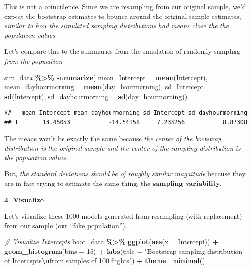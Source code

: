 \documentclass[
]{book}
\newenvironment{Shaded}{\begin{snugshade}}{\end{snugshade}}
\newcommand{\AttributeTok}[1]{\textcolor[rgb]{0.13,0.29,0.53}{#1}}
\newcommand{\CommentTok}[1]{\textcolor[rgb]{0.56,0.35,0.01}{\textit{#1}}}
\newcommand{\DecValTok}[1]{\textcolor[rgb]{0.00,0.00,0.81}{#1}}
\newcommand{\FunctionTok}[1]{\textcolor[rgb]{0.13,0.29,0.53}{\textbf{#1}}}
\newcommand{\NormalTok}[1]{#1}
\newcommand{\SpecialCharTok}[1]{\textcolor[rgb]{0.81,0.36,0.00}{\textbf{#1}}}
\newcommand{\StringTok}[1]{\textcolor[rgb]{0.31,0.60,0.02}{#1}}
\begin{document}
This is not a coincidence. Since we are resampling from our original sample, we'd expect the bootstrap estimates to bounce around the original sample estimates, \emph{similar to how the simulated sampling distributions had means close the the population values}

Let's compare this to the summaries from the simulation of randomly sampling \emph{from the population}.

\begin{Shaded}
\begin{Highlighting}[]
\NormalTok{sim\_data }\SpecialCharTok{\%\textgreater{}\%} 
    \FunctionTok{summarize}\NormalTok{(}
        \AttributeTok{mean\_Intercept =} \FunctionTok{mean}\NormalTok{(Intercept),}
        \AttributeTok{mean\_dayhourmorning =} \FunctionTok{mean}\NormalTok{(day\_hourmorning),}
        \AttributeTok{sd\_Intercept =} \FunctionTok{sd}\NormalTok{(Intercept),}
        \AttributeTok{sd\_dayhourmorning =} \FunctionTok{sd}\NormalTok{(day\_hourmorning))}
\end{Highlighting}
\end{Shaded}

\begin{verbatim}
##   mean_Intercept mean_dayhourmorning sd_Intercept sd_dayhourmorning
## 1       13.45053           -14.54158     7.233256           8.87308
\end{verbatim}

The means won't be exactly the same because \emph{the center of the bootstrap distribution is the original sample and the center of the sampling distribution is the population values}.

But, \emph{the standard deviations should be of roughly similar magnitude} because they are in fact trying to estimate the same thing, the \textbf{sampling variability}.

\textbf{4. Visualize}

Let's visualize these 1000 models generated from resampling (with replacement) from our sample (our ``fake population'').

\begin{Shaded}
\begin{Highlighting}[]
\CommentTok{\# Visualize Intercepts}
\NormalTok{boot\_data }\SpecialCharTok{\%\textgreater{}\%} 
    \FunctionTok{ggplot}\NormalTok{(}\FunctionTok{aes}\NormalTok{(}\AttributeTok{x =}\NormalTok{ Intercept)) }\SpecialCharTok{+}
    \FunctionTok{geom\_histogram}\NormalTok{(}\AttributeTok{bins =} \DecValTok{15}\NormalTok{) }\SpecialCharTok{+}
    \FunctionTok{labs}\NormalTok{(}\AttributeTok{title =} \StringTok{"Bootstrap sampling distribution of Intercepts}\SpecialCharTok{\textbackslash{}n}\StringTok{from samples of 100 flights"}\NormalTok{) }\SpecialCharTok{+}
    \FunctionTok{theme\_minimal}\NormalTok{()}
\end{Highlighting}
\end{Shaded}
\end{document}
